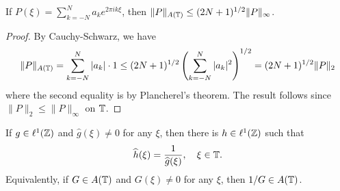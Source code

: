 \begin{lemma}\label{lem:poly-AT}
  If $P(\xi) = \sum_{k = -N}^N a_k e^{2\pi i k \xi}$,
  then
  $\|P\|_{A(\mathbb{T})} \le (2N + 1)^{1 / 2} \|P\|_\infty$.
\end{lemma}

\begin{proof}
  By Cauchy-Schwarz, we have
  \[
    \|P\|_{A(\mathbb{T})}
    = \sum_{k = -N}^N |a_k| \cdot 1
    \le (2N + 1)^{1 / 2}
    \left(\sum_{k = -N}^N |a_k|^2\right)^{1 / 2}
    = (2N + 1)^{1 / 2} \|P\|_2
  \]
  where the second equality
  is by Plancherel's theorem.
  The result follows since
  $\|P\|_2 \le \|P\|_\infty$ on
  $\mathbb{T}$.
\end{proof}

\pagebreak
\begin{lemma}
  If $g \in \ell^1(\mathbb{Z})$ and
  $\widehat{g}(\xi) \ne 0$ for any
  $\xi$, then there is
  $h \in \ell^1(\mathbb{Z})$ such that
  \[
    \widehat{h}(\xi)
    = \frac{1}{\widehat{g}(\xi)},
    \quad \xi \in \mathbb{T}.
  \]
  Equivalently, if
  $G \in A(\mathbb{T})$ and
  $G(\xi) \ne 0$ for any $\xi$, then
  $1 / G \in A(\mathbb{T})$.
\end{lemma}

